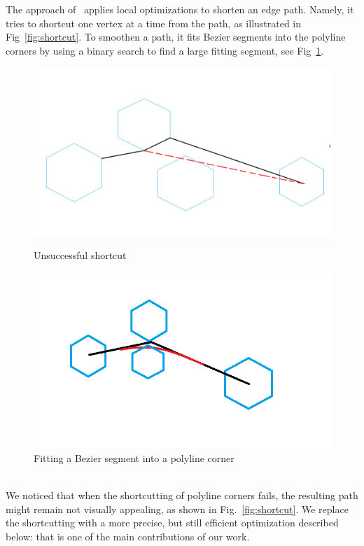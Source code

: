\documentclass{llncs}
\begin{document}
The approach of~\cite{dwyer2010fast} applies local optimizations to shorten an edge path.
Namely, it tries to shortcut one vertex at a time from the path, as illustrated in Fig~\ref{fig:shortcut}.
To smoothen a path, it fits Bezier segments into the polyline corners by
using a binary search to find a large fitting segment, see Fig~\ref{fig:cornerfit}.
\begin{figure}[!tbp]
  \centering
  \begin{minipage}[b]{0.4\textwidth}
    \includegraphics[width=\textwidth]{./naive_shorcut_now_working.png}
    \caption{Unsuccessful shortcut}
    \label{fig:shortcut}
  \end{minipage}
  \hfill
  \begin{minipage}[b]{0.4\textwidth}
    \includegraphics[width=\textwidth]{fillet_corner.png}
    \caption{Fitting a Bezier segment into a polyline corner}
    \label{fig:cornerfit}
  \end{minipage}
\end{figure}
\\
We noticed that when the shortcutting of polyline corners fails, the resulting path might remain not visually appealing, as shown in Fig.~\ref{fig:shortcut}.
We replace the shortcutting with a more precise, but still efficient optimization described below: that is one of the main contributions of our work.
\end{document}
